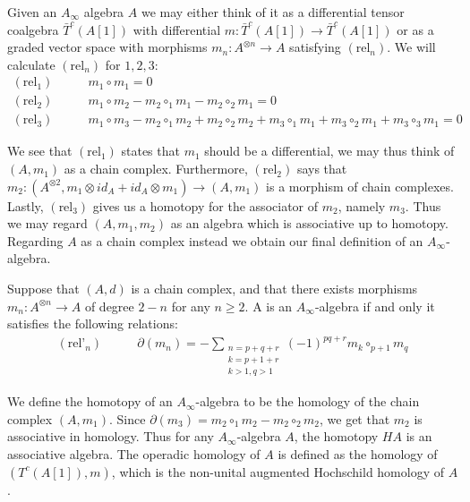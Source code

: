 \documentclass[../thesis.tex]{subfiles}
\begin{document}
        Given an $A_\infty$ algebra $A$ we may either think of it as a differential tensor coalgebra $\bar{T}^c(A[1])$ with differential $m: \bar{T}^c(A[1])\rightarrow \bar{T}^c(A[1])$ or as a graded vector space with morphisms $m_n:A^{\otimes n} \rightarrow A$ satisfying $(\text{rel}_n)$. We will calculate $(\text{rel}_n)$ for $1,2,3$:
        \begin{align*}
            (\text{rel}_1)\qquad & m_1\circ m_1 = 0 \\
            (\text{rel}_2)\qquad & m_1\circ m_2 - m_2\circ_{1}m_1 - m_2\circ_2m_1 = 0 \\
            (\text{rel}_3)\qquad & m_1\circ m_3 - m_2\circ_1 m_2 + m_2\circ_2m_2 + m_3\circ_1m_1 + m_3\circ_2m_1 + m_3\circ_3m_1 = 0 
        \end{align*}

        We see that $(\text{rel}_1)$ states that $m_1$ should be a differential, we may thus think of $(A, m_1)$ as a chain complex. Furthermore, $(\text{rel}_2)$ says that $m_2 : (A^{\otimes 2}, m_1\otimes id_A + id_A\otimes m_1) \rightarrow (A, m_1)$ is a morphism of chain complexes. Lastly, $(\text{rel}_3)$ gives us a homotopy for the associator of $m_2$, namely $m_3$. Thus we may regard $(A, m_1, m_2)$ as an algebra which is associative up to homotopy. Regarding $A$ as a chain complex instead we obtain our final definition of an $A_\infty$-algebra.

        \begin{proposition}
            Suppose that $(A, d)$ is a chain complex, and that there exists morphisms $m_n: A^{\otimes n} \rightarrow A$ of degree $2-n$ for any $n\geq 2$. A is an $A_\infty$-algebra if and only it satisfies the following relations:
            \begin{align*}
                (\text{rel'}_n)\qquad & \partial(m_n) = -\sum_{\substack{n = p + q + r \\ k = p + 1 + r \\ k > 1, q > 1}}(-1)^{pq + r}m_k\circ_{p+1}m_q
            \end{align*}
        \end{proposition}

        We define the homotopy of an $A_\infty$-algebra to be the homology of the chain complex $(A, m_1)$. Since $\partial(m_3) = m_2\circ_1m_2 - m_2\circ_2m_2$, we get that $m_2$ is associative in homology. Thus for any $A_\infty$-algebra $A$, the homotopy $HA$ is an associative algebra. The operadic homology of $A$ is defined as the homology of $(T^c(A[1]), m)$, which is the non-unital augmented Hochschild homology of $A$.
\end{document}
